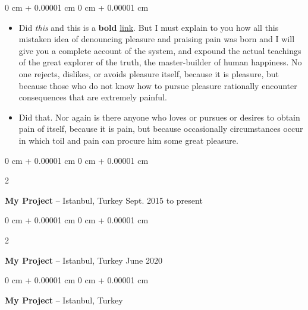 \documentclass[10pt, letterpaper]{article}
\newenvironment{highlights}{
    \begin{itemize}[
        topsep=0.10 cm,
        parsep=0.10 cm,
        partopsep=0pt,
        itemsep=0pt,
        leftmargin=0 cm + 10pt
    ]
}{
    \end{itemize}
} %
\newenvironment{onecolentry}{
    \begin{adjustwidth}{
        0 cm + 0.00001 cm
    }{
        0 cm + 0.00001 cm
    }
}{
    \end{adjustwidth}
} %
\newenvironment{twocolentry}[2][]{
    \onecolentry
    \def\secondColumn{#2}
    \setcolumnwidth{\fill, 4.5 cm}
    \begin{paracol}{2}
}{
    \switchcolumn \raggedleft \secondColumn
    \end{paracol}
    \endonecolentry
} %
\begin{document}
        \vspace{0.10 cm}
        \begin{onecolentry}
            \begin{highlights}
                \item Did \textit{this} and this is a \textbf{bold} \href{https://example.com}{link}. But I must explain to you how all this mistaken idea of denouncing pleasure and praising pain was born and I will give you a complete account of the system, and expound the actual teachings of the great explorer of the truth, the master-builder of human happiness. No one rejects, dislikes, or avoids pleasure itself, because it is pleasure, but because those who do not know how to pursue pleasure rationally encounter consequences that are extremely painful.
                \item Did that. Nor again is there anyone who loves or pursues or desires to obtain pain of itself, because it is pain, but because occasionally circumstances occur in which toil and pain can procure him some great pleasure.
            \end{highlights}
        \end{onecolentry}


        \vspace{0.2 cm}

        \begin{twocolentry}{
            Sept. 2015 to present
        }
            \textbf{My Project} -- Istanbul, Turkey\end{twocolentry}



        \vspace{0.2 cm}

        \begin{twocolentry}{
            June 2020
        }
            \textbf{My Project} -- Istanbul, Turkey\end{twocolentry}



        \vspace{0.2 cm}

        \begin{onecolentry}
            \textbf{My Project} -- Istanbul, Turkey\end{onecolentry}
\end{document}
